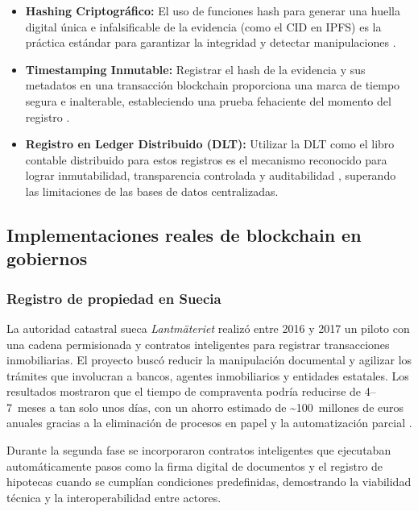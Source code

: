 \begin{itemize}
    \item \textbf{Hashing Criptográfico:} El uso de funciones hash para generar una huella digital única e infalsificable de la evidencia (como el CID en IPFS) es la práctica estándar para garantizar la integridad y detectar manipulaciones \parencite{benet2014ipfs}. 
    \item \textbf{Timestamping Inmutable:} Registrar el hash de la evidencia y sus metadatos en una transacción blockchain proporciona una marca de tiempo segura e inalterable, estableciendo una prueba fehaciente del momento del registro \parencite{nakamoto2008bitcoin}. 
    \item \textbf{Registro en Ledger Distribuido (DLT):} Utilizar la DLT como el libro contable distribuido para estos registros es el mecanismo reconocido para lograr inmutabilidad, transparencia controlada y auditabilidad \parencite{swan2015blockchain}, superando las limitaciones de las bases de datos centralizadas.
\end{itemize}

\subsection{Implementaciones reales de blockchain en gobiernos}

\subsubsection{Registro de propiedad en Suecia}

La autoridad catastral sueca \textit{Lantmäteriet} realizó entre 2016 y 2017 un piloto con una cadena permisionada y contratos inteligentes para registrar transacciones inmobiliarias. El proyecto buscó reducir la manipulación documental y agilizar los trámites que involucran a bancos, agentes inmobiliarios y entidades estatales. Los resultados mostraron que el tiempo de compraventa podría reducirse de 4--7~meses a tan solo unos días, con un ahorro estimado de \textasciitilde{}100~millones de euros anuales gracias a la eliminación de procesos en papel y la automatización parcial \parencite{lantmateriet2017,lantmateriet_cointelegraph2017,lantmateriet_cointelegraph2_2017}.

Durante la segunda fase se incorporaron contratos inteligentes que ejecutaban automáticamente pasos como la firma digital de documentos y el registro de hipotecas cuando se cumplían condiciones predefinidas, demostrando la viabilidad técnica y la interoperabilidad entre actores.

